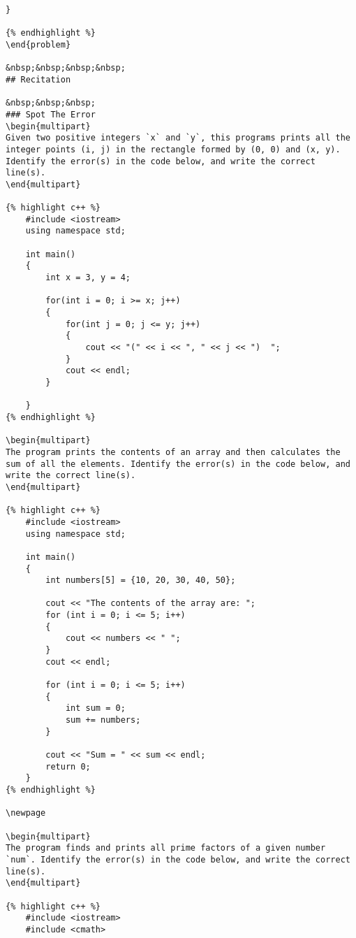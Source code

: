 {{{{{{{{{{{{\begin{problem}
\begin{verbatim}
}

{% endhighlight %}
\end{problem}

&nbsp;&nbsp;&nbsp;&nbsp;
## Recitation

&nbsp;&nbsp;&nbsp;
### Spot The Error
\begin{multipart}
Given two positive integers `x` and `y`, this programs prints all the integer points (i, j) in the rectangle formed by (0, 0) and (x, y). Identify the error(s) in the code below, and write the correct line(s).
\end{multipart}

{% highlight c++ %}
    #include <iostream>
    using namespace std;
    
    int main() 
    {
        int x = 3, y = 4;
    
        for(int i = 0; i >= x; j++)
        {
            for(int j = 0; j <= y; j++)
            {
                cout << "(" << i << ", " << j << ")  ";
            }
            cout << endl;
        }
    
    }
{% endhighlight %}

\begin{multipart}
The program prints the contents of an array and then calculates the sum of all the elements. Identify the error(s) in the code below, and write the correct line(s).
\end{multipart}

{% highlight c++ %}
    #include <iostream>
    using namespace std;
    
    int main()
    {
        int numbers[5] = {10, 20, 30, 40, 50};
    
        cout << "The contents of the array are: ";
        for (int i = 0; i <= 5; i++)
        {
            cout << numbers << " ";
        }
        cout << endl;
    
        for (int i = 0; i <= 5; i++)
        {
            int sum = 0;
            sum += numbers;
        }
    
        cout << "Sum = " << sum << endl;
        return 0;
    }
{% endhighlight %}

\newpage

\begin{multipart}
The program finds and prints all prime factors of a given number `num`. Identify the error(s) in the code below, and write the correct line(s).
\end{multipart}

{% highlight c++ %}
    #include <iostream>
    #include <cmath>
    

\end{verbatim}
\end{problem}}}}}}}}}}}}}
